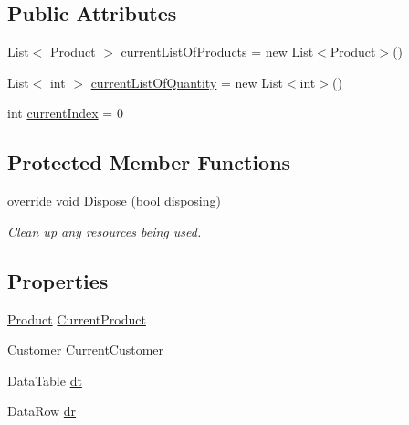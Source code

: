 \subsection*{Public Attributes}
\begin{DoxyCompactItemize}
\item 
List$<$ \hyperlink{class_health___assignment_1_1_product}{Product} $>$ \hyperlink{class_health___assignment_1_1_add_new_sales_form_aafe2302622fea6335356c0f73302d820}{current\+List\+Of\+Products} = new List$<$\hyperlink{class_health___assignment_1_1_product}{Product}$>$()
\item 
List$<$ int $>$ \hyperlink{class_health___assignment_1_1_add_new_sales_form_a3caff43744085bd4f1d7509dac117f88}{current\+List\+Of\+Quantity} = new List$<$int$>$()
\item 
int \hyperlink{class_health___assignment_1_1_add_new_sales_form_a0abab1ef2ad1b440046b80023aa3287e}{current\+Index} = 0
\end{DoxyCompactItemize}
\subsection*{Protected Member Functions}
\begin{DoxyCompactItemize}
\item 
override void \hyperlink{class_health___assignment_1_1_add_new_sales_form_a20d5c3fadae42782e6149f6080d49664}{Dispose} (bool disposing)
\begin{DoxyCompactList}\small\item\em Clean up any resources being used. \end{DoxyCompactList}\end{DoxyCompactItemize}
\subsection*{Properties}
\begin{DoxyCompactItemize}
\item 
\hyperlink{class_health___assignment_1_1_product}{Product} \hyperlink{class_health___assignment_1_1_add_new_sales_form_aa1b76a32823f1a4dbc5d888885cb1e47}{Current\+Product}
\item 
\hyperlink{class_health___assignment_1_1_customer}{Customer} \hyperlink{class_health___assignment_1_1_add_new_sales_form_a3580ca6c70831272aafbe754920d2e0a}{Current\+Customer}
\item 
Data\+Table \hyperlink{class_health___assignment_1_1_add_new_sales_form_a226c77bd8ed176b89ff0057551ac337a}{dt}
\item 
Data\+Row \hyperlink{class_health___assignment_1_1_add_new_sales_form_a33f77a0c9649fe2a2a86c84486dce272}{dr}
\end{DoxyCompactItemize}


